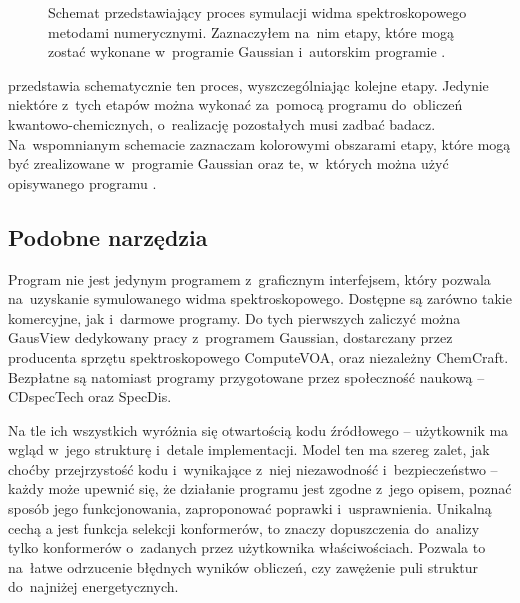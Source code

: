 \begin{figure*}
  
  \caption{
    Schemat przedstawiający proces symulacji widma spektroskopowego metodami numerycznymi.
    Zaznaczyłem na~nim etapy, które mogą zostać wykonane w~programie Gaussian i~autorskim
      programie \tesliper{}.
  }\label{fig:simulation-flow}
\end{figure*}

 przedstawia schematycznie ten proces, wyszczególniając kolejne etapy.
Jedynie niektóre z~tych etapów można wykonać za~pomocą programu do~obliczeń kwantowo-chemicznych,
  o~realizację pozostałych musi zadbać badacz.
Na~wspomnianym schemacie zaznaczam kolorowymi obszarami etapy, które mogą być zrealizowane
  w~programie Gaussian oraz te, w~których można użyć opisywanego programu \tesliper{}.

\subsection{Podobne narzędzia}\label{essence:simmilar}
Program \tesliper{} nie jest jedynym programem z~graficznym interfejsem, który pozwala
  na~uzyskanie symulowanego widma spektroskopowego.
Dostępne są zarówno takie komercyjne, jak i~darmowe programy.
Do tych pierwszych zaliczyć można GausView dedykowany pracy z~programem
  Gaussian, dostarczany przez producenta sprzętu spektroskopowego ComputeVOA,
  oraz niezależny ChemCraft.
Bezpłatne są natomiast programy przygotowane przez społeczność naukową \---
  CDspecTech oraz SpecDis.

Na tle ich wszystkich \tesliper{} wyróżnia się otwartością kodu źródłowego \---
  użytkownik ma wgląd w~jego strukturę i~detale implementacji.
Model ten ma szereg zalet, jak choćby przejrzystość kodu i~wynikające z~niej niezawodność
  i~bezpieczeństwo \--- każdy może upewnić się, że działanie programu jest zgodne z~jego opisem,
  poznać sposób jego funkcjonowania, zaproponować poprawki i~usprawnienia.
Unikalną cechą \tesliper{}a jest funkcja selekcji konformerów, to znaczy dopuszczenia do~analizy
  tylko konformerów o~zadanych przez użytkownika właściwościach.
Pozwala to na~łatwe odrzucenie błędnych wyników obliczeń, czy zawężenie puli struktur do~najniżej
  energetycznych.


